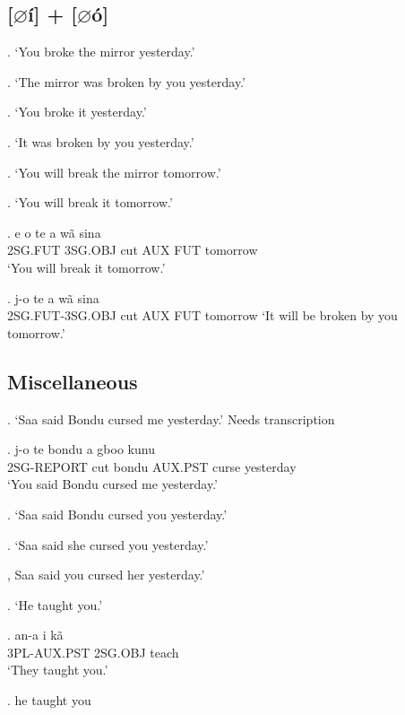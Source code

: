 \documentclass{assets/fieldnotes}
\begin{document}
\subsection{[$\varnothing$í] + [$\varnothing$ó]}

\ex. `You broke the mirror yesterday.'

\ex. `The mirror was broken by you yesterday.'

\ex. `You broke it yesterday.'

\ex. `It was broken by you yesterday.'

\ex. `You will break the mirror tomorrow.'

\ex. `You will break it tomorrow.'

\exg. e o te a wã sina \\
2SG.FUT 3SG.OBJ cut AUX FUT tomorrow \\
`You will break it tomorrow.'

\ex. j-o te a wã sina \\
2SG.FUT-3SG.OBJ cut AUX FUT tomorrow
`It will be broken by you tomorrow.'

\subsection{Miscellaneous}


\ex. `Saa said Bondu cursed me yesterday.'
{ Needs transcription}

\exg. j-o te bondu a gboo kunu \\
2SG-REPORT cut bondu AUX.PST curse yesterday \\
`You said Bondu cursed me yesterday.'

\ex. `Saa said Bondu cursed you yesterday.'

\ex. `Saa said she cursed you yesterday.'

\ex, Saa said you cursed her yesterday.'


\ex. `He taught you.'

\exg. an-a i kã \\
3PL-AUX.PST 2SG.OBJ teach \\
`They taught you.'

\ex. he taught you
\end{document}
